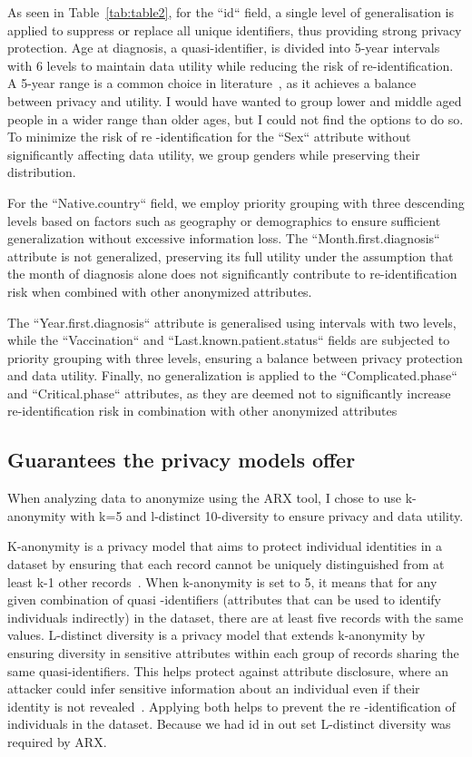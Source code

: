 As seen in Table~\ref{tab:table2}, for the ``id`` field, a single level of generalisation is applied to suppress or replace all unique
identifiers, thus
providing
strong privacy protection. Age at diagnosis, a quasi-identifier, is divided into 5-year intervals with 6 levels to maintain data utility
while reducing the risk of re-identification. A 5-year range is a common choice in literature~\cite[672]{el2009globally}, as it achieves a balance between privacy
and utility. I would have wanted to group lower and middle aged people in a wider range than older ages, but I could not find the options
to do so.
To
minimize the risk of re
-identification for the
``Sex``
attribute without significantly affecting data utility, we group genders while preserving their distribution.

For the ``Native.country`` field, we employ priority grouping with three descending levels based on factors such as geography or demographics to ensure sufficient generalization without excessive information loss. The ``Month.first.diagnosis`` attribute is not generalized, preserving its full utility under the assumption that the month of diagnosis alone does not significantly contribute to re-identification risk when combined with other anonymized attributes.

The ``Year.first.diagnosis`` attribute is generalised using intervals with two levels, while the ``Vaccination`` and ``Last.known.patient.status`` fields are subjected to priority grouping with three levels, ensuring a balance between privacy protection and data utility. Finally, no generalization is applied to the ``Complicated.phase`` and ``Critical.phase`` attributes, as they are deemed not to significantly increase re-identification risk in combination with other anonymized attributes

\subsection{Guarantees the privacy models offer}\label{subsec:guarantees-the-privacy-models-offer}

When analyzing data to anonymize using the ARX tool, I chose to use k-anonymity with k=5 and l-distinct 10-diversity to ensure privacy
and data utility.

K-anonymity is a privacy model that aims to protect individual identities in a dataset by ensuring that each record cannot be uniquely
distinguished from at least k-1 other records~\cite[]{sweeney2002k}.
When k-anonymity is set to 5, it means that for any given
combination of quasi
-identifiers (attributes that can be used to identify individuals indirectly) in the dataset, there are at least five records with the same
values.
L-distinct diversity is a privacy model that extends k-anonymity by ensuring diversity in sensitive attributes within each group
of records sharing the same quasi-identifiers.
This helps protect against attribute disclosure, where an attacker could infer sensitive
information about an individual even if their identity is not revealed~\cite[]{sweeney2002k}.
Applying both helps to prevent the re
-identification of individuals in the dataset.
Because we had id in out set L-distinct diversity was required by ARX.

